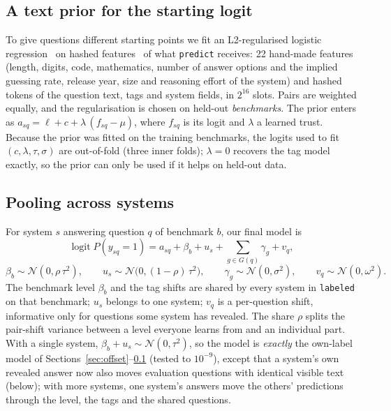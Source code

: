 \documentclass{article}
\newcommand{\code}[1]{\texttt{#1}}
\newcommand{\labeled}{\code{labeled}}
\newcommand{\N}{\mathcal{N}}
\begin{document}
\subsection{A text prior for the starting logit}
\label{sec:prior}
To give questions different starting points we fit an L2-regularised logistic regression~\citep{pedregosa2011} on hashed features~\citep{weinberger2009} of what \code{predict} receives: 22 hand-made features (length, digits, code, mathematics, number of answer options and the implied guessing rate, release year, size and reasoning effort of the system) and hashed tokens of the question text, tags and system fields, in $2^{16}$ slots. Pairs are weighted equally, and the regularisation is chosen on held-out \emph{benchmarks}. The prior enters as $a_{sq} = \ell + c + \lambda\,(f_{sq} - \mu)$, where $f_{sq}$ is its logit and $\lambda$ a learned trust. Because the prior was fitted on the training benchmarks, the logits used to fit $(c,\lambda,\tau,\sigma)$ are out-of-fold (three inner folds); $\lambda = 0$ recovers the tag model exactly, so the prior can only be used if it helps on held-out data.

\subsection{Pooling across systems}
\label{sec:pooled}
For system $s$ answering question $q$ of benchmark $b$, our final model is
\begin{equation}
  \operatorname{logit} P(y_{sq}=1) = a_{sq} + \beta_b + u_s + \sum_{g \in G(q)} \gamma_g + v_q,
  \label{eq:pooled}
\end{equation}
\begin{equation*}
  \beta_b \sim \N(0, \rho\,\tau^2), \qquad u_s \sim \N\big(0, (1-\rho)\,\tau^2\big), \qquad \gamma_g \sim \N(0,\sigma^2), \qquad v_q \sim \N(0,\omega^2).
\end{equation*}
The benchmark level $\beta_b$ and the tag shifts are shared by every system in \labeled{} on that benchmark; $u_s$ belongs to one system; $v_q$ is a per-question shift, informative only for questions some system has revealed. The share $\rho$ splits the pair-shift variance between a level everyone learns from and an individual part. With a single system, $\beta_b + u_s \sim \N(0,\tau^2)$, so the model is \emph{exactly} the own-label model of Sections~\ref{sec:offset}--\ref{sec:prior} (tested to $10^{-9}$), except that a system's own revealed answer now also moves evaluation questions with identical visible text (below); with more systems, one system's answers move the others' predictions through the level, the tags and the shared questions.
\end{document}
